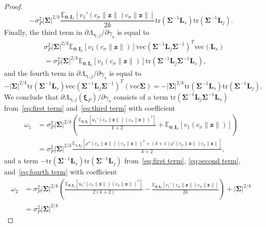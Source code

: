 \documentclass[10pt,a4paper]{amsart}
\newcommand{\E}{\mathbb{E}}
\newcommand{\bI}{\mathbf{I}}
\newcommand{\bL}{\mathbf{L}}
\newcommand{\bSigma}{\mathbf{\Sigma}}
\newcommand{\bgamma}{\bm\gamma}
\newcommand{\bxi}{\bm\xi}
\newcommand{\bz}{\mathbf{z}}
\newcommand{\vc}{\mathrm{vec}}
\begin{document}
\begin{proof}
\begin{equation}
-\sigma_P^2
|\bSigma|^{2/k}
\frac{\E_{\mathbf{0},\bI_k}
\left[
v_1'(c_\sigma\|\bz\|)c_\sigma\|\bz\|
\right]}{2k}
\text{tr}\left(\bSigma^{-1}\bL_s\right)
\text{tr}\left(\bSigma^{-1}\bL_j\right).
\end{equation}
Finally, the third term in $\partial\Lambda_{\bgamma,j}/\partial\gamma_s$ is equal to
\begin{equation}
\label{eq:third term}
\begin{split}
&
\sigma_P^2
|\bSigma|^{2/k}
\E_{\mathbf{0},\bI_k}
\left[
v_1(c_\sigma\|\bz\|)
\right]
\vc(\bSigma^{-1}\bL_j\bSigma^{-1})^T
\vc(\bL_s)\\
&=
\sigma_P^2
|\bSigma|^{2/k}
\E_{\mathbf{0},\bI_k}
\left[
v_1(c_\sigma\|\bz\|)
\right]
\text{tr}(\bSigma^{-1}\bL_j\bSigma^{-1}\bL_s),
\end{split}
\end{equation}
and the fourth term in $\partial\Lambda_{\bgamma,j}/\partial\gamma_s$ is equal to
\begin{equation}
\label{eq:fourth term}
-|\bSigma|^{2/k}
\text{tr}
\left(
\bSigma^{-1}\bL_s
\right)
\vc(\bSigma^{-1}\bL_j\bSigma^{-1})^T(\vc\bSigma)
=
-|\bSigma|^{2/k}
\text{tr}
\left(
\bSigma^{-1}\bL_s
\right)
\text{tr}
\left(
\bSigma^{-1}\bL_j
\right).
\end{equation}
We conclude that $\partial\Lambda_{\bgamma,j}(\bxi_P)/\partial \gamma_s$ consists of
a term
$\text{tr}(\bSigma^{-1}\bL_j\bSigma^{-1}\bL_s)$
from~\eqref{eq:first term} and~\eqref{eq:third term}
with coefficient
\[
\begin{split}
\omega_1
&=
\sigma_P^2
|\bSigma|^{2/k}
\left(
\frac{\E_{\mathbf{0},\bI_k}
\left[
u_1'(c_\sigma\|\bz\|)(c_\sigma\|\bz\|)^3
\right]}{k+2}
+
\E_{\mathbf{0},\bI_k}
\left[
v_1(c_\sigma\|\bz\|)
\right]
\right)\\
&=
\sigma_P^2
|\bSigma|^{2/k}
\frac{\mathbb{E}_{0,\mathbf{I}_k}
\left[
\rho''(c_\sigma\|\bz\|)(c_\sigma\|\bz\|)^2+(k+1)\rho'(c_\sigma\|\bz\|)c_\sigma\|\bz\|
\right]}{k+2},
\end{split}
\]
and a term $-\text{tr}(\bSigma^{-1}\bL_s)\text{tr}(\bSigma^{-1}\bL_j)$ 
from~\eqref{eq:first term}, \eqref{eq:second term}, and~\eqref{eq:fourth term}
with coefficient
\[
\begin{split}
\omega_2
&=
\sigma_P^2
|\bSigma|^{2/k}
\left(
\frac{\E_{\mathbf{0},\bI_k}
\left[
u_1'(c_\sigma\|\bz\|)(c_\sigma\|\bz\|)^3
\right]}{2(k+2)}
-
\frac{\E_{\mathbf{0},\bI_k}
\left[
v_1'(c_\sigma\|\bz\|)c_\sigma\|\bz\|
\right]}{2k}
\right)
+
|\bSigma|^{2/k}\\
&=
\sigma_P^2
|\bSigma|^{2/k}

\end{split}\]
\end{proof}
\end{document}

